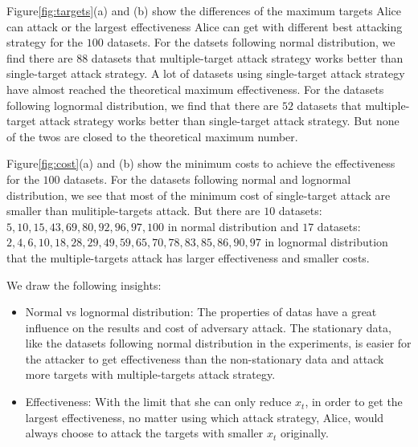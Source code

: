 \documentclass[journal]{IEEEtran}
\begin{document}
{Figure\ref{fig:targets}(a) and (b) show the differences of the maximum targets Alice can attack or the largest effectiveness Alice can get with different best attacking strategy for the $100$ datasets. For the datsets following normal distribution, we find there are $88$ datasets that multiple-target attack strategy works better than single-target attack strategy. A lot of datasets using single-target attack strategy have almost reached the theoretical maximum effectiveness. For the datasets following lognormal distribution, we find that there are $52$ datasets that multiple-target attack strategy works better than single-target attack strategy. But none of the twos are closed to the theoretical maximum number.

\begin{figure*}[htbp!]
\centering
{}
\caption{Maximum targets}
\label{fig:targets}
\end{figure*}

Figure\ref{fig:cost}(a) and (b) show the minimum costs to achieve the effectiveness for the $100$ datasets. For the datasets following normal and lognormal distribution, we see that most of the minimum cost of single-target attack are smaller than mulitiple-targets attack. But there are $10$ datasets: $5, 10, 15, 43, 69, 80, 92, 96, 97, 100$ in normal distribution and $17$ datasets: $2, 4, 6, 10, 18, 28, 29, 49, 59, 65, 70, 78, 83, 85, 86, 90, 97$ in lognormal distribution that the multiple-targets attack has larger effectiveness and smaller costs.

\begin{figure*}[htbp!]
\centering
{}
\caption{Minimum cost}
\label{fig:cost}
\end{figure*}

We draw the following insights:
\begin{itemize}
	\item Normal vs lognormal distribution: The properties of datas have a great influence on the results and cost of adversary attack. The stationary data, like the datasets following normal distribution in the experiments, is easier for the attacker to get effectiveness than the non-stationary data and attack more targets with multiple-targets attack strategy.
	\item Effectiveness: With the limit that she can only reduce $x_t$, in order to get the largest effectiveness, no matter using which attack strategy, Alice, would always choose to attack the targets with smaller $x_t$ originally.
\end{itemize}



}
\end{document}
